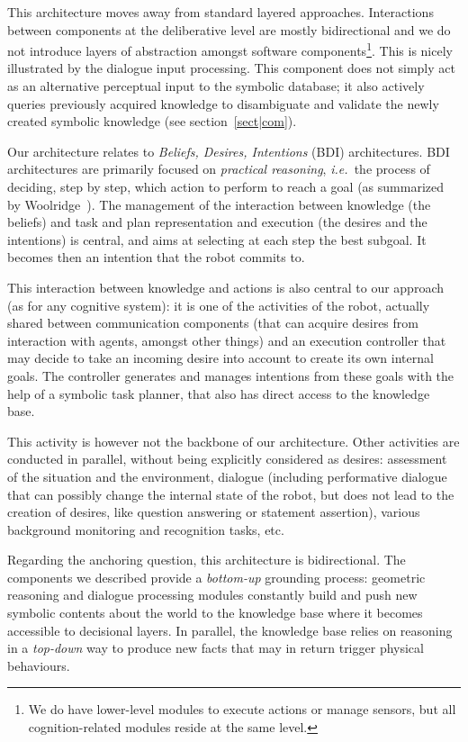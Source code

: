 \documentclass[preprint,5p]{elsarticle}
\newcommand{\ie}{{\textit{i.e.\ }}}
\begin{document}
This architecture moves away from standard layered approaches. Interactions
between components at the deliberative level are mostly bidirectional and we do
not introduce layers of abstraction amongst software components\footnote{We do
have lower-level modules to execute actions or manage sensors, but all
cognition-related modules reside at the same level.}. This is nicely
illustrated by the dialogue input processing. This component does not simply
act as an alternative perceptual input to the symbolic database; it also
actively queries previously acquired knowledge to disambiguate and validate the
newly created symbolic knowledge (see section~\ref{sect|com}).

Our architecture relates to \emph{Beliefs, Desires, Intentions} (BDI)
architectures. BDI architectures are primarily focused on \emph{practical
reasoning}, \ie the process of deciding, step by step, which action to perform
to reach a goal (as summarized by Woolridge~\cite{Woolridge1999}). The
management of the interaction between knowledge (the beliefs) and task and plan
representation and execution (the desires and the intentions) is central, and
aims at selecting at each step the best subgoal. It becomes then an intention
that the robot commits to.

This interaction between knowledge and actions is also central to our approach
(as for any cognitive system): it is one of the activities of the
robot, actually shared between communication components (that can acquire
desires from interaction with agents, amongst other things) and an execution
controller that may decide to take an incoming desire into account to create
its own internal goals. The controller generates and manages intentions from
these goals with the help of a symbolic task planner, that also has direct
access to the knowledge base.

This activity is however not the backbone of our architecture. Other
activities are conducted in parallel, without being explicitly considered as
desires: assessment of the situation and the environment, dialogue (including
performative dialogue that can possibly change the internal state of the robot,
but does not lead to the creation of desires, like question answering or
statement assertion), various background monitoring and recognition tasks, etc.

Regarding the anchoring question, this architecture is bidirectional. The
components we described provide a \textit{bottom-up} grounding process:
geometric reasoning and dialogue processing modules constantly build and push
new symbolic contents about the world to the knowledge base where it becomes
accessible to decisional layers. In parallel, the knowledge base relies on
reasoning in a \textit{top-down} way to produce new facts that may in return
trigger physical behaviours.
\end{document}

